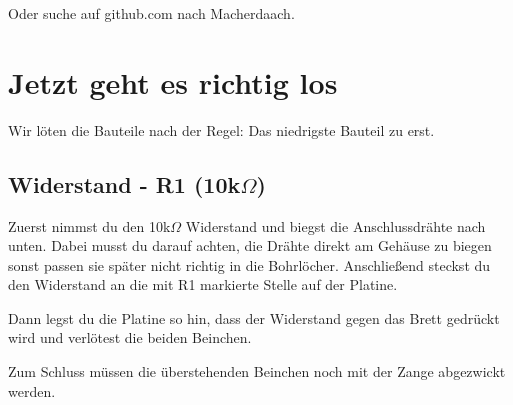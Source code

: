 \documentclass{article}
\begin{document}
Oder suche auf github.com nach Macherdaach.

\section{Jetzt geht es richtig los}
Wir löten die Bauteile nach der Regel: Das niedrigste Bauteil zu erst.

\subsection{Widerstand - R1 (10k$\Omega$)}
Zuerst nimmst du den 10k$\Omega$ Widerstand und biegst die Anschlussdrähte nach unten. Dabei musst du darauf achten, die Drähte direkt am Gehäuse zu biegen sonst passen sie später nicht richtig in die Bohrlöcher. Anschließend steckst du den Widerstand an die mit R1 markierte Stelle auf der Platine.

Dann legst du die Platine so hin, dass der Widerstand gegen das Brett gedrückt wird und verlötest die beiden Beinchen.

Zum Schluss müssen die überstehenden Beinchen noch mit der Zange abgezwickt werden.

\vspace{1cm}
\end{document}

